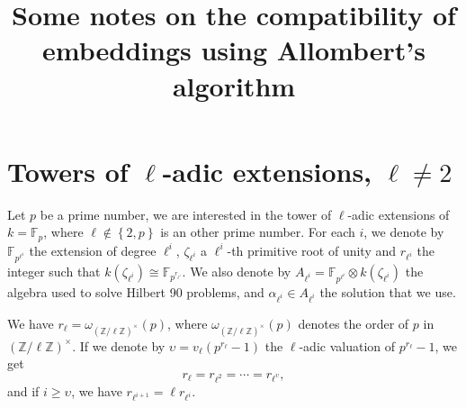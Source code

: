 \documentclass[a4paper,11pt]{article}
\title{Some notes on the compatibility of embeddings using Allombert's algorithm}
\author{}
\begin{document}
\maketitle





\section{Towers of $\ell$-adic extensions, $\ell\neq2$}
\label{sec:ladic}

Let $p$ be a prime number, we are interested in the tower of $\ell$-adic extensions of
$k=\mathbb{F}_p$, where $\ell\notin\left\{ 2, p
\right\}$ is an other prime
number. For each $i$, we denote by
$\mathbb{F}_{p^{\ell^i}}$ the extension of degree $\ell^i$, $\zeta_{\ell^i}$ a
$\ell^i$-th primitive root of unity and $r_{\ell^i}$ the integer such that
$k(\zeta_{\ell^i})\cong\mathbb{F}_{p^{r_{\ell^i}}}$. We also denote by
$A_{\ell^i}=\mathbb{F}_{p^{\ell^i}}\otimes
k(\zeta_{\ell^i})$ the algebra used to solve Hilbert 90 problems, and
$\alpha_{\ell^i}\in A_{\ell^i}$ the
solution that we use.

We have $r_{\ell}=\omega_{(\mathbb{Z}/\ell\mathbb{Z})^\times}(p)$, where
$\omega_{(\mathbb{Z}/\ell\mathbb{Z})^\times}(p)$ denotes the order of $p$ in
$(\mathbb{Z}/\ell\mathbb{Z})^\times$. If we denote by $\upsilon=v_\ell(p^{r_\ell}-1)$
the $\ell$-adic valuation of $p^{r_\ell}-1$, we get 
\[
  r_\ell = r_{\ell^2} = \cdots = r_{\ell^{\upsilon}},
\]
and if $i\geq\upsilon$, we have $r_{\ell^{i+1}}=\ell r_{\ell^i}$.
\end{document}
